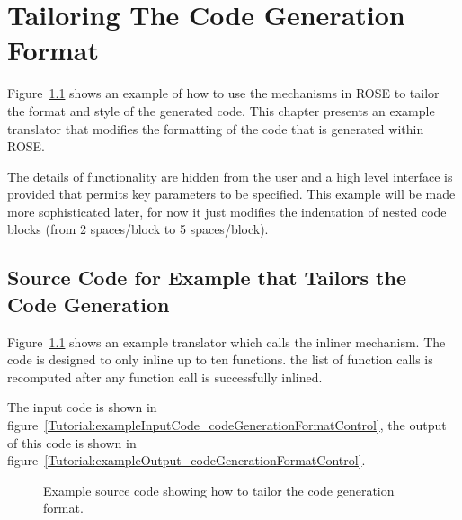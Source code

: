 \chapter{Tailoring The Code Generation Format}

   Figure~\ref{Tutorial:example_codeGenerationFormatControl} shows an
example of how to use the mechanisms in ROSE to tailor the format and
style of the generated code.  This chapter presents an example translator 
that modifies the formatting of the code that is generated within ROSE.

The details of functionality are hidden from the user and a high level 
interface is provided that permits key parameters to be specified.
This example will be made more sophisticated later, for now it just
 modifies the indentation of nested code blocks (from 2 spaces/block 
to 5 spaces/block).


\section{Source Code for Example that Tailors the Code Generation}

    Figure~\ref{Tutorial:example_codeGenerationFormatControl}
shows an example translator which calls the inliner mechanism.
The code is designed to only inline up to ten functions.
the list of function calls is recomputed after any function call
is successfully inlined. 

The input code is shown in figure~\ref{Tutorial:exampleInputCode_codeGenerationFormatControl},
the output of this code is shown in 
figure~\ref{Tutorial:exampleOutput_codeGenerationFormatControl}.

\begin{figure}[!h]
{\indent
{\mySmallFontSize

\begin{latexonly}
   
\end{latexonly}

\begin{htmlonly}
   
\end{htmlonly}

}
}
\caption{Example source code showing how to tailor the code generation format. }
\label{Tutorial:example_codeGenerationFormatControl}
\end{figure}


